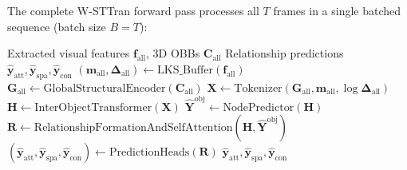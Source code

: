 \documentclass{article}
\newcommand{\mat}[1]{\bm{#1}}
\begin{document}
The complete W-STTran forward pass processes all $T$ frames in a single batched sequence (batch size $B=T$):

\begin{algorithm}[h]
\caption{W-STTran Forward Pass}
\label{alg:wsttran}
\begin{algorithmic}[1]
\Require Extracted visual features $\mat{f}_{\text{all}}$, 3D OBBs $\mat{C}_{\text{all}}$
\Ensure Relationship predictions $\hat{\mat{y}}_{\text{att}}, \hat{\mat{y}}_{\text{spa}}, \hat{\mat{y}}_{\text{con}}$
\State $(\mat{m}_{\text{all}}, \bm{\Delta}_{\text{all}}) \gets \text{LKS\_Buffer}(\mat{f}_{\text{all}})$ 
\State $\mat{G}_{\text{all}} \gets \text{GlobalStructuralEncoder}(\mat{C}_{\text{all}})$ 
\State $\mat{X} \gets \text{Tokenizer}(\mat{G}_{\text{all}}, \mat{m}_{\text{all}}, \log \bm{\Delta}_{\text{all}})$ 
\State $\mat{H} \gets \text{InterObjectTransformer}(\mat{X})$ 
\State $\hat{\mat{Y}}^{\text{obj}} \gets \text{NodePredictor}(\mat{H})$ 
\State $\mat{R} \gets \text{RelationshipFormationAndSelfAttention}(\mat{H}, \hat{\mat{Y}}^{\text{obj}})$ 
\State $(\hat{\mat{y}}_{\text{att}}, \hat{\mat{y}}_{\text{spa}}, \hat{\mat{y}}_{\text{con}}) \gets \text{PredictionHeads}(\mat{R})$
\State \Return $\hat{\mat{y}}_{\text{att}}, \hat{\mat{y}}_{\text{spa}}, \hat{\mat{y}}_{\text{con}}$
\end{algorithmic}
\end{algorithm}
\end{document}
